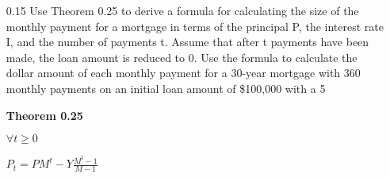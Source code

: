 \documentclass[12pt, a4paper]{article}
\begin{document}
\begin{enumerate}
\item[0.15]
Use Theorem 0.25 to derive a formula for calculating the size of the monthly payment for a mortgage in terms of the principal P, the interest rate I, and the number of payments t. Assume that after t payments have been made, the loan amount is reduced to 0. Use the formula to calculate the dollar amount of each monthly payment for a 30-year mortgage with 360 monthly payments on an initial loan amount of \$100,000 with a 5%


\textbf{Theorem 0.25}

$\forall t \geq 0$


$P_t=PM^t-Y\frac{M^t-1}{M-1}$
\end{enumerate}
\end{document}
